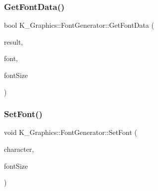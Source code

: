 \subsubsection{\texorpdfstring{Get\+Font\+Data()}{GetFontData()}}
{\footnotesize\ttfamily bool K\+\_\+\+Graphics\+::\+Font\+Generator\+::\+Get\+Font\+Data (\begin{DoxyParamCaption}\item[{\mbox{\hyperlink{struct_k___graphics_1_1_font_generator_1_1_font_data}{Font\+Data}} \&}]{result,  }\item[{wchar\+\_\+t}]{font,  }\item[{int}]{font\+Size }\end{DoxyParamCaption})}

\mbox{\label{class_k___graphics_1_1_font_generator_a012e42323f6a295173f63e9acfc82dfc}} 
\subsubsection{\texorpdfstring{Set\+Font()}{SetFont()}}
{\footnotesize\ttfamily void K\+\_\+\+Graphics\+::\+Font\+Generator\+::\+Set\+Font (\begin{DoxyParamCaption}\item[{wchar\+\_\+t}]{character,  }\item[{int}]{font\+Size }\end{DoxyParamCaption})}

